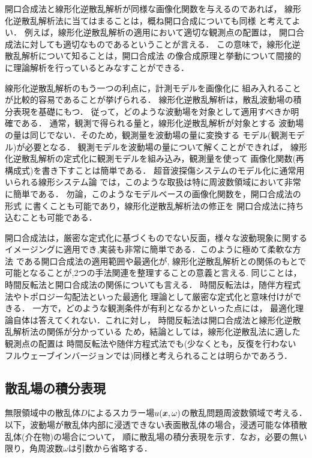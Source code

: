 開口合成法と線形化逆散乱解析が同様な画像化関数を与えるのであれば，
線形化逆散乱解析法に当てはまることは，概ね開口合成についても同様
と考えてよい．
例えば，線形化逆散乱解析の適用において適切な観測点の配置は，
開口合成法に対しても適切なものであるということが言える．
この意味で，線形化逆散乱解析について知ることは，開口合成法
の像合成原理と挙動について間接的に理論解析を行っているとみなすことができる．


線形化逆散乱解析のもう一つの利点に，計測モデルを画像化に
組み入れることが比較的容易であることが挙げられる．
線形化逆散乱解析は，散乱波動場の積分表現を基礎にもつ．
従って，どのような波動場を対象として適用すべきか明確である．
通常，観測で得られる量と，線形化逆散乱解析が対象とする
波動場の量は同じでない．そのため，観測量を波動場の量に変換する
モデル(観測モデル)が必要となる．
観測モデルを波動場の量について解くことができれば，
線形化逆散乱解析の定式化に観測モデルを組み込み，観測量を使って
画像化関数(再構成式)を書き下すことは簡単である．
超音波探傷システムのモデル化に通常用いられる線形システム論
では，このような取扱は特に周波数領域において非常に簡単である．
勿論，このようなモデルベースの画像化関数を，開口合成法の形式
に書くことも可能であり，線形化逆散乱解析法の修正を
開口合成法に持ち込むことも可能である．

開口合成法は，厳密な定式化に基づくものでない反面，様々な波動現象に関する
イメージングに適用でき,実装も非常に簡単である．このように極めて柔軟な方法
である開口合成法の適用範囲や最適化が, 線形化逆散乱解析との関係のもとで
可能となることが,2つの手法関連を整理することの意義と言える.
同じことは，時間反転法と開口合成法の関係についても言える．
時間反転法は，随伴方程式法やトポロジー勾配法といった最適化
理論として厳密な定式化と意味付けができる．
一方で，どのような観測条件が有利となるかといった点には，
最適化理論自体は答えてくれない．これに対し，
時間反転法は開口合成法と線形化逆散乱解析法の関係が分かっている
ため，結論としては，線形化逆散乱法に適した観測点の配置は
時間反転法や随伴方程式法でも(少なくとも，反復を行わない
フルウェーブインバージョンでは)同様と考えられることは明らかであろう．
\subsection{散乱場の積分表現}
無限領域中の散乱体$D$によるスカラー場$u(\mbox{\boldmath $x$},\omega)$の散乱問題周波数領域で考える．
以下，波動場が散乱体内部に浸透できない表面散乱体の場合，浸透可能な体積散乱体(介在物)の場合について，
順に散乱場の積分表現を示す．なお，必要の無い限り，角周波数$\omega$は引数から省略する．
